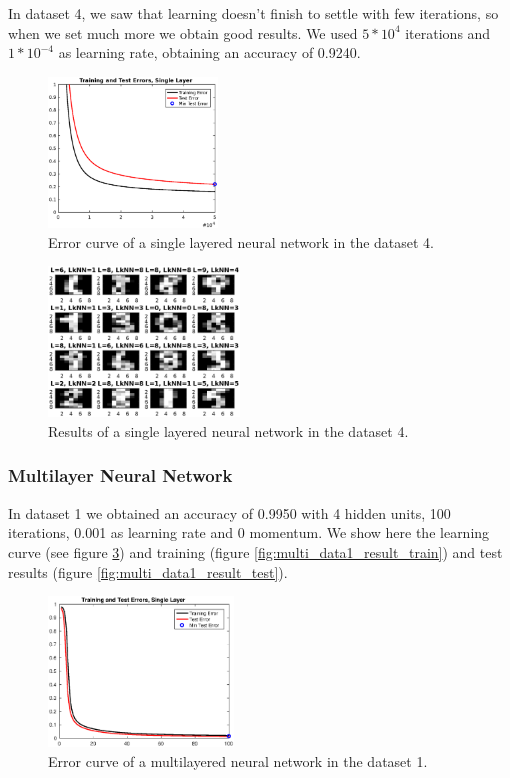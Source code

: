 \documentclass{article}
\begin{document}
In dataset 4, we saw that learning doesn't finish to settle with few iterations, so when we set much more we obtain good results. We used $5*10^4$ iterations and $1*10^{-4}$ as learning rate, obtaining an accuracy of 0.9240.

\begin{figure}[!htb]
\centering
\includegraphics[height=4cm]{images/single_data4_error}
\caption{Error curve of a single layered neural network in the dataset 4.}
\label{fig:single_data4_error}
\end{figure}

\begin{figure}[!htb]
\centering
\includegraphics[height=4cm]{images/single_data4_result}
\caption{Results of a single layered neural network in the dataset 4.}
\label{fig:single_data4_result}
\end{figure}


\subsubsection{Multilayer Neural Network}

In dataset 1 we obtained an accuracy of 0.9950 with 4 hidden units, 100 iterations, 0.001 as learning rate and 0 momentum. We show here the learning curve (see figure \ref{fig:multi_data1_error}) and training (figure \ref{fig:multi_data1_result_train}) and test results (figure \ref{fig:multi_data1_result_test}).

\begin{figure}[!htb]
\centering
\includegraphics[height=4cm]{images/multi_data1_error}
\caption{Error curve of a multilayered neural network in the dataset 1.}
\label{fig:multi_data1_error}
\end{figure}
\end{document}
